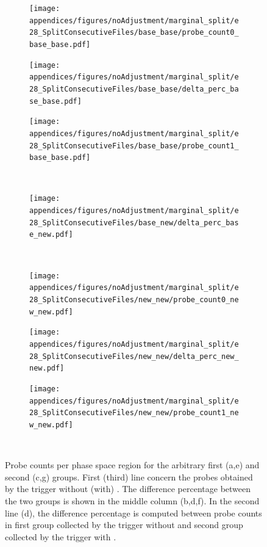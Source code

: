 \begin{figure}
  \centering
\begin{subfigure}[c]{.32\textwidth}
\centering
\texttt{[image: appendices/figures/noAdjustment/marginal\_split/e28\_SplitConsecutiveFiles/base\_base/probe\_count0\_base\_base.pdf]}
\caption{}%
\label{fig:probe_group0_base}
\end{subfigure}
\begin{subfigure}[c]{.32\textwidth}
\centering
\texttt{[image: appendices/figures/noAdjustment/marginal\_split/e28\_SplitConsecutiveFiles/base\_base/delta\_perc\_base\_base.pdf]}
\caption{}%
\label{fig:probe_delta_perc_base_base}
\end{subfigure}
\begin{subfigure}[c]{.32\textwidth}
\centering
\texttt{[image: appendices/figures/noAdjustment/marginal\_split/e28\_SplitConsecutiveFiles/base\_base/probe\_count1\_base\_base.pdf]}
\caption{}%
\label{fig:probe_group1_base}
\end{subfigure} \\
\hspace*{\fill}
\begin{subfigure}[c]{.32\textwidth}
\texttt{[image: appendices/figures/noAdjustment/marginal\_split/e28\_SplitConsecutiveFiles/base\_new/delta\_perc\_base\_new.pdf]}
\caption{}%
\label{fig:probe_delta_perc_base_new}
\end{subfigure}
\hspace*{\fill} \\
\begin{subfigure}[c]{.32\textwidth}
\centering
\texttt{[image: appendices/figures/noAdjustment/marginal\_split/e28\_SplitConsecutiveFiles/new\_new/probe\_count0\_new\_new.pdf]}
\caption{}%
\label{fig:probe_group0_new}
\end{subfigure}
\begin{subfigure}[c]{.32\textwidth}
\centering
\texttt{[image: appendices/figures/noAdjustment/marginal\_split/e28\_SplitConsecutiveFiles/new\_new/delta\_perc\_new\_new.pdf]}
\caption{}%
\label{fig:probe_delta_perc_new_new}
\end{subfigure}
\begin{subfigure}[c]{.32\textwidth}
\centering
\texttt{[image: appendices/figures/noAdjustment/marginal\_split/e28\_SplitConsecutiveFiles/new\_new/probe\_count1\_new\_new.pdf]}
\caption{}%
\label{fig:probe_group1_new}
\end{subfigure} \\
\caption{\label{fig:probe_groups}Probe counts per phase space region for the
  arbitrary first (a,e) and second (c,g) groups. First (third) line concern the probes
obtained by the trigger without (with) \rnn{}. The difference percentage between
the two groups is shown in the middle column (b,d,f). In the second line (d),
the difference percentage is computed between probe counts in first group
collected by the trigger without \rnn{} and second group collected by the
trigger with \rnn{}.}
\end{figure}

